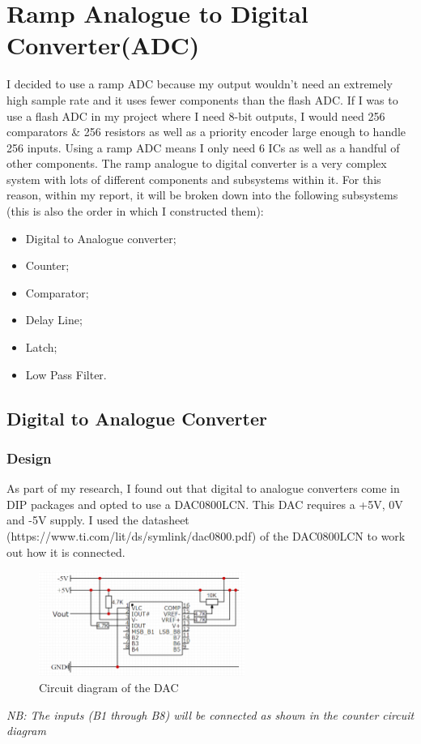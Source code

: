 \section{Ramp Analogue to Digital Converter(ADC)}
I decided to use a ramp ADC because my output wouldn’t need an extremely high sample rate and it uses fewer components than the flash ADC. If I was to use a flash ADC in my project where I need 8-bit outputs, I would need 256 comparators \& 256 resistors as well as a priority encoder large enough to handle 256 inputs. Using a ramp ADC means I only need 6 ICs as well as a handful of other components. \newline
The ramp analogue to digital converter is a very complex system with lots of different components and subsystems within it. For this reason, within my report, it will be broken down into the following subsystems (this is also the order in which I constructed them):
\begin{itemize}
    \item Digital to Analogue converter;
    \item Counter;
    \item Comparator;
    \item Delay Line;
    \item Latch;
    \item Low Pass Filter.
\end{itemize}
\subsection{Digital to Analogue Converter}
\subsubsection{Design}
As part of my research, I found out that digital to analogue converters come in DIP packages and opted to use a DAC0800LCN. This DAC requires a +5V, 0V and -5V supply. \newline
I used the datasheet (https://www.ti.com/lit/ds/symlink/dac0800.pdf) of the DAC0800LCN to work out how it is connected.
\begin{figure} [H]
    \centering
    \includegraphics[width=0.6\textwidth]{images/dacCircuitDiagram.png}
    \caption{Circuit diagram of the DAC}
    \label{fig:dacCircuitDiagram}
\end{figure}
\noindent \textit{NB: The inputs (B1 through B8) will be connected as shown in the counter circuit diagram}

